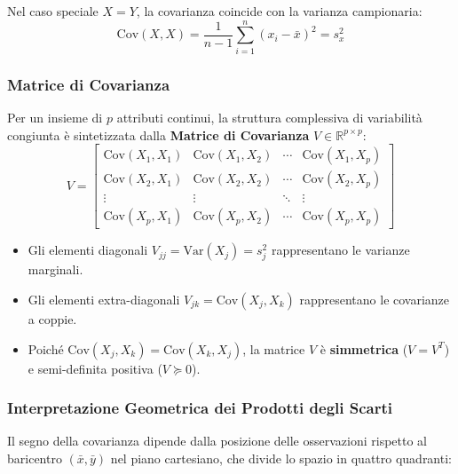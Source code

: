 Nel caso speciale $X = Y$, la covarianza coincide con la varianza campionaria:
\begin{equation}
    \text{Cov}(X, X) = \frac{1}{n-1} \sum_{i=1}^n (x_i - \bar{x})^2 = s_x^2
\end{equation}

\subsubsection{Matrice di Covarianza}
Per un insieme di $p$ attributi continui, la struttura complessiva di variabilità congiunta è sintetizzata dalla \textbf{Matrice di Covarianza} $V \in \mathbb{R}^{p \times p}$:
\begin{equation}
    V = \begin{bmatrix}
        \text{Cov}(X_1, X_1) & \text{Cov}(X_1, X_2) & \cdots & \text{Cov}(X_1, X_p) \\
        \text{Cov}(X_2, X_1) & \text{Cov}(X_2, X_2) & \cdots & \text{Cov}(X_2, X_p) \\
        \vdots & \vdots & \ddots & \vdots \\
        \text{Cov}(X_p, X_1) & \text{Cov}(X_p, X_2) & \cdots & \text{Cov}(X_p, X_p)
    \end{bmatrix}
\end{equation}
\begin{itemize}[noitemsep]
    \item Gli elementi diagonali $V_{jj} = \text{Var}(X_j) = s_j^2$ rappresentano le varianze marginali.
    \item Gli elementi extra-diagonali $V_{jk} = \text{Cov}(X_j, X_k)$ rappresentano le covarianze a coppie.
    \item Poiché $\text{Cov}(X_j, X_k) = \text{Cov}(X_k, X_j)$, la matrice $V$ è \textbf{simmetrica} ($V = V^T$) e semi-definita positiva ($V \succeq 0$).
\end{itemize}

\subsubsection{Interpretazione Geometrica dei Prodotti degli Scarti}
Il segno della covarianza dipende dalla posizione delle osservazioni rispetto al baricentro $(\bar{x}, \bar{y})$ nel piano cartesiano, che divide lo spazio in quattro quadranti:

